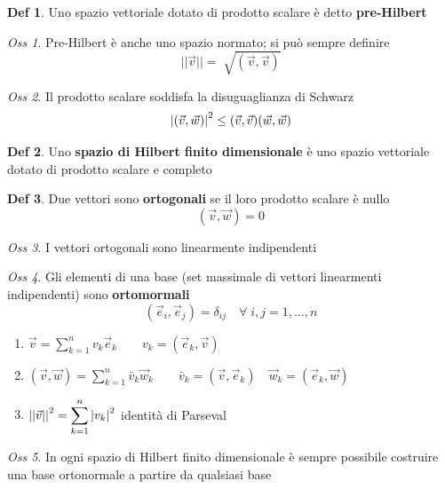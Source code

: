 \documentclass[a4paper,11pt]{report}
\theoremstyle{remark}
\newtheorem*{oss}{Oss}
\theoremstyle{definition}
\newtheorem*{Def}{Def}
\DeclarePairedDelimiter{\abs}{\lvert}{\rvert}
\begin{document}
\begin{Def}
	Uno spazio vettoriale dotato di prodotto scalare è detto \textbf{pre-Hilbert}
\end{Def}

\begin{oss}
	Pre-Hilbert è anche uno spazio normato; si può sempre definire
	\[||\vec{v}|| = \sqrt[]{(\vec{v}, \vec{v})}\]
\end{oss}

\begin{oss}
	Il prodotto scalare soddisfa la disuguaglianza di Schwarz
	\[{\abs{(\vec{v},\vec{w})}}^2 \le (\vec{v},\vec{v})(\vec{w},\vec{w})\]
\end{oss}

\begin{Def}
	Uno \textbf{spazio di Hilbert finito dimensionale} è uno spazio vettoriale dotato di prodotto scalare e completo 
\end{Def}

\begin{Def}
	Due vettori sono \textbf{ortogonali} se il loro prodotto scalare è nullo
	\[(\vec{v},\vec{w})=0\]
\end{Def}

\begin{oss}
	I vettori ortogonali sono linearmente indipendenti 
\end{oss}

\begin{oss}
	Gli elementi di una base (set massimale di vettori linearmenti indipendenti) sono \textbf{ortomormali}
	\[(\vec{e}_i,\vec{e}_j) = \delta_{ij} \quad \forall \; i,j = 1,\dots,n\]
	\begin{enumerate}
		\item $\vec{v} = \displaystyle \sum_{k=1}^n v_k \vec{e}_k \qquad v_k = (\vec{e}_k,\vec{v})$
  \item $(\vec{v},\vec{w})= \displaystyle \sum_{k=1}^n \bar{v}_k\vec{w}_k \qquad \bar{v}_k = (\vec{v}, \vec{e}_k) \quad \vec{w}_k = (\vec{e}_k,\vec{w})$
  \item ${||\vec{v}||}^2 = \displaystyle \sum_{k=1}^n {\abs{v_k}}^2$ identità di Parseval
	\end{enumerate}
\end{oss}

\begin{oss}
	In ogni spazio di Hilbert finito dimensionale è sempre possibile costruire una base ortonormale a partire da qualsiasi base 
\end{oss}
\end{document}
